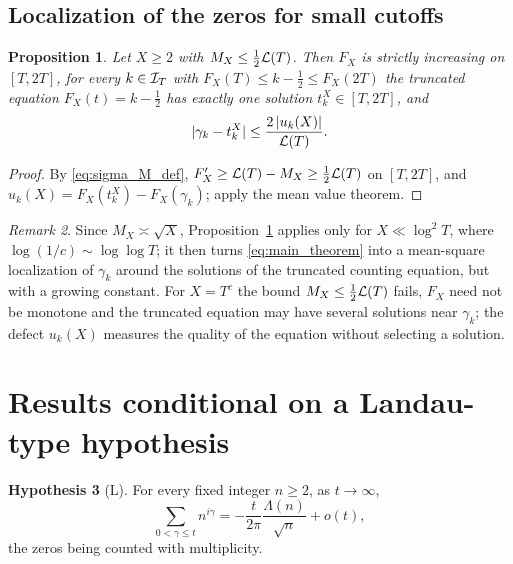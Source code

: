 \documentclass[11pt,reqno]{amsart}
\theoremstyle{plain}\newtheorem{theorem}{Theorem}[section]\newtheorem{proposition}[theorem]{Proposition}\newtheorem{lemma}[theorem]{Lemma}\newtheorem{corollary}[theorem]{Corollary}
\theoremstyle{definition}\newtheorem{hypothesis}[theorem]{Hypothesis}\newtheorem{definition}[theorem]{Definition}
\theoremstyle{remark}\newtheorem{remark}[theorem]{Remark}\newtheorem{experiment}[theorem]{Experiment}\newtheorem{question}[theorem]{Question}\newtheorem{heuristic}[theorem]{Heuristic}\newtheorem{conjecture}[theorem]{Conjecture}
\begin{document}
\subsection{Localization of the zeros for small cutoffs}
\label{subsec:localization}

\begin{proposition}\label{prop:localization}
Let $X\ge2$ with $M_X\le\frac12\mathcal L(T)$. Then $F_X$ is strictly increasing on $[T,2T]$, for every $k\in\mathcal I_T$ with $F_X(T)\le k-\frac12\le F_X(2T)$ the truncated equation $F_X(t)=k-\frac12$ has exactly one solution $t_k^X\in[T,2T]$, and
\begin{equation}
|\gamma_k-t_k^X|\le\frac{2\,|u_k(X)|}{\mathcal L(T)} .
\label{eq:localization}
\end{equation}
\end{proposition}

\begin{proof}
By \eqref{eq:sigma_M_def}, $F_X'\ge\mathcal L(T)-M_X\ge\frac12\mathcal L(T)$ on $[T,2T]$, and $u_k(X)=F_X(t_k^X)-F_X(\gamma_k)$; apply the mean value theorem.
\end{proof}

\begin{remark}\label{rem:localization_scope}
Since $M_X\asymp\sqrt X$, Proposition~\ref{prop:localization} applies only for $X\ll\log^2T$, where $\log(1/c)\sim\log\log T$; it then turns \eqref{eq:main_theorem} into a mean-square localization of $\gamma_k$ around the solutions of the truncated counting equation, but with a growing constant. For $X=T^c$ the bound $M_X\le\frac12\mathcal L(T)$ fails, $F_X$ need not be monotone and the truncated equation may have several solutions near $\gamma_k$; the defect $u_k(X)$ measures the quality of the equation without selecting a solution.
\end{remark}

\section{Results conditional on a Landau-type hypothesis}
\label{sec:conditional}

\begin{hypothesis}[L]\label{hyp:L}
For every fixed integer $n\ge2$, as $t\to\infty$,
\begin{equation}
\sum_{0<\gamma\le t}n^{i\gamma}=-\frac t{2\pi}\frac{\Lambda(n)}{\sqrt n}+o(t),
\label{eq:hyp_L}
\end{equation}
the zeros being counted with multiplicity.
\end{hypothesis}
\end{document}
